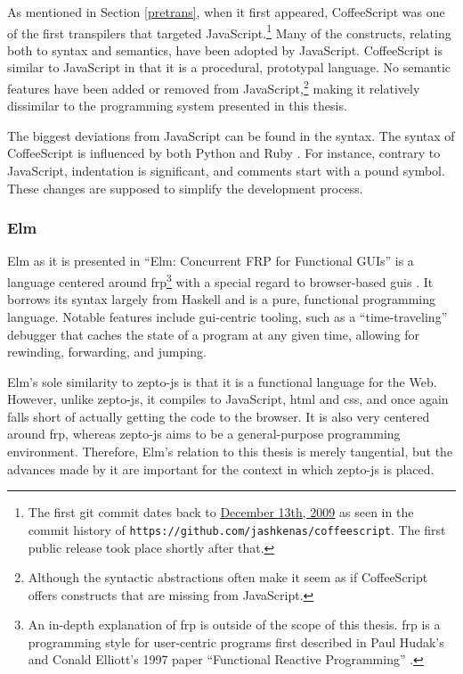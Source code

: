 \documentclass[oneside,11pt,xetex]{scrbook}
\begin{document}
As mentioned in Section \ref{pretrans}, when it first appeared, CoffeeScript was one of the first transpilers that targeted JavaScript.\footnote{The first git commit
dates back to
\href{https://github.com/jashkenas/coffeescript/commit/8e9d637985d2dc9b44922076ad54ffef7fa8e9c2}{December 13th, 2009} as seen in the
commit history of \texttt{https://github.com/jashkenas/coffeescript}.
The first public release took place shortly after that.} Many of the constructs,
relating both to syntax and semantics, have been adopted by JavaScript.
CoffeeScript is similar to JavaScript in that it is a procedural, prototypal
language. No semantic features have been added or removed from JavaScript,\footnote{Although
the syntactic abstractions often make it seem as if CoffeeScript offers
constructs that are missing from JavaScript.} making it relatively
dissimilar to the programming system presented in this thesis.

The biggest deviations from JavaScript can be found in the syntax.
The syntax of CoffeeScript is influenced by both Python and Ruby \parencite{COFF}.
For instance, contrary to JavaScript, indentation is significant, and
comments start with a pound symbol. These changes are supposed to simplify
the development process.

\subsubsection{Elm}

Elm as it is presented in ``Elm: Concurrent FRP for Functional GUIs''
is a language centered around \gls{frp}\footnote{An in-depth
explanation of \gls{frp} is outside of the scope of this thesis.
\gls{frp} is a programming style for user-centric programs first described
in Paul Hudak's and Conald Elliott's 1997 paper ``Functional Reactive
Programming'' \parencite{FRP}.} with a special regard to browser-based
\glspl{gui} \parencite{CPL}. It borrows its syntax largely from Haskell
and is a pure, functional programming language. Notable features include
\gls{gui}-centric tooling, such as a ``time-traveling'' debugger that caches
the state of a program at any given time, allowing for rewinding, forwarding,
and jumping.

Elm's sole similarity to zepto-js is that it is a functional language for the Web.
However, unlike zepto-js, it compiles to JavaScript, \gls{html} and \gls{css}, and
once again falls short of actually getting the code to the browser. It is also very
centered around \gls{frp}, whereas zepto-js aims to be a general-purpose programming
environment. Therefore, Elm's relation to this thesis is merely tangential, but the
advances made by it are important for the context in which zepto-js is placed.
\end{document}
